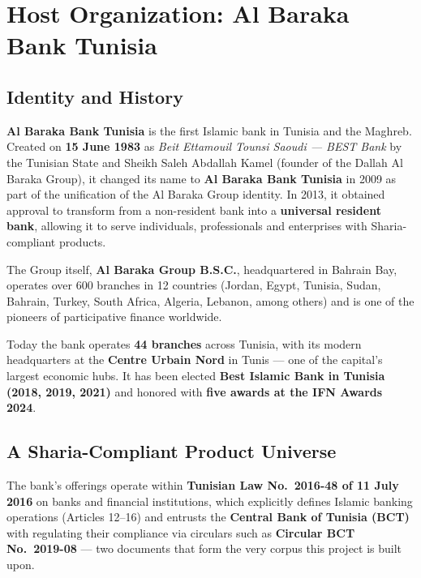 \documentclass[a4paper,12pt]{report}
\begin{document}
\chapter{Host Organization: Al Baraka Bank Tunisia}

\section{Identity and History}

\textbf{Al Baraka Bank Tunisia} is the first Islamic bank in Tunisia and the Maghreb. Created on \textbf{15 June 1983} as \textit{Beit Ettamouil Tounsi Saoudi --- BEST Bank} by the Tunisian State and Sheikh Saleh Abdallah Kamel (founder of the Dallah Al Baraka Group), it changed its name to \textbf{Al Baraka Bank Tunisia} in 2009 as part of the unification of the Al Baraka Group identity. In 2013, it obtained approval to transform from a non-resident bank into a \textbf{universal resident bank}, allowing it to serve individuals, professionals and enterprises with Sharia-compliant products.

The Group itself, \textbf{Al Baraka Group B.S.C.}, headquartered in Bahrain Bay, operates over 600 branches in 12 countries (Jordan, Egypt, Tunisia, Sudan, Bahrain, Turkey, South Africa, Algeria, Lebanon, among others) and is one of the pioneers of participative finance worldwide.

Today the bank operates \textbf{44 branches} across Tunisia, with its modern headquarters at the \textbf{Centre Urbain Nord} in Tunis --- one of the capital's largest economic hubs. It has been elected \textbf{Best Islamic Bank in Tunisia (2018, 2019, 2021)} and honored with \textbf{five awards at the IFN Awards 2024}.

\section{A Sharia-Compliant Product Universe}

The bank's offerings operate within \textbf{Tunisian Law No.\ 2016-48 of 11 July 2016} on banks and financial institutions, which explicitly defines Islamic banking operations (Articles 12--16) and entrusts the \textbf{Central Bank of Tunisia (BCT)} with regulating their compliance via circulars such as \textbf{Circular BCT No.\ 2019-08} --- two documents that form the very corpus this project is built upon.
\end{document}

